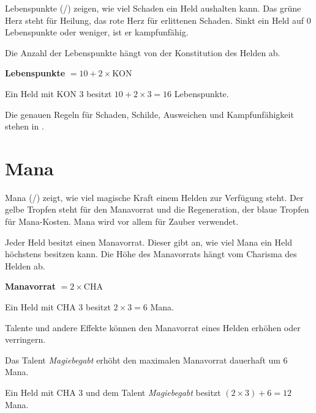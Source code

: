 Lebenspunkte (\lifeGain/\lifeLoss) zeigen, wie viel Schaden ein Held aushalten kann. Das grüne Herz steht für Heilung, das rote Herz für erlittenen Schaden. Sinkt ein Held auf 0 Lebenspunkte oder weniger, ist er kampfunfähig.

Die Anzahl der Lebenspunkte hängt von der Konstitution des Helden ab.

\begin{kurzregel}[title=Lebenspunkte berechnen]
\textbf{Lebenspunkte} $= 10 + 2 \times \mathrm{KON}$
\end{kurzregel}

\begin{beispiel}[title=Beispiel]
Ein Held mit KON 3 besitzt $10 + 2 \times 3 = 16$ Lebenspunkte.
\end{beispiel}

Die genauen Regeln für Schaden, Schilde, Ausweichen und Kampfunfähigkeit stehen in .

\section{Mana}

Mana (\manaGain/\manaLoss) zeigt, wie viel magische Kraft einem Helden zur Verfügung steht. Der gelbe Tropfen steht für den Manavorrat und die Regeneration, der blaue Tropfen für Mana-Kosten. Mana wird vor allem für Zauber verwendet.

Jeder Held besitzt einen Manavorrat. Dieser gibt an, wie viel Mana ein Held höchstens besitzen kann. Die Höhe des Manavorrats hängt vom Charisma des Helden ab.

\begin{kurzregel}[title=Manavorrat berechnen]
\textbf{Manavorrat} $= 2 \times \mathrm{CHA}$
\end{kurzregel}

\begin{beispiel}[title=Beispiel]
Ein Held mit CHA 3 besitzt $2 \times 3 = 6$ Mana.
\end{beispiel}

Talente und andere Effekte können den Manavorrat eines Helden erhöhen oder verringern.

\begin{kurzregel}[title=Magiebegabt]
Das Talent \emph{Magiebegabt} erhöht den maximalen Manavorrat dauerhaft um 6 Mana.
\end{kurzregel}

\begin{beispiel}[title=Beispiel]
Ein Held mit CHA 3 und dem Talent \emph{Magiebegabt} besitzt $(2 \times 3) + 6 = 12$ Mana.
\end{beispiel}

